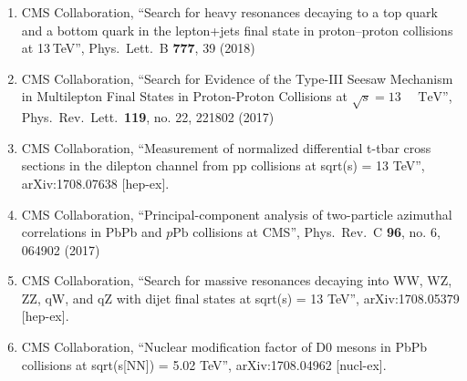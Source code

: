 \begin{enumerate}
\item CMS Collaboration, ``Search for heavy resonances decaying to a top quark and a bottom quark in the lepton+jets final state in proton–proton collisions at 13 TeV'', Phys.\ Lett.\ B {\bf 777}, 39 (2018)

\item CMS Collaboration, ``Search for Evidence of the Type-III Seesaw Mechanism in Multilepton Final States in Proton-Proton Collisions at $\sqrt{s}=13\text{ }\text{ }\mathrm{TeV}$'', Phys.\ Rev.\ Lett.\  {\bf 119}, no. 22, 221802 (2017)

\item CMS Collaboration, ``Measurement of normalized differential t-tbar cross sections in the dilepton channel from pp collisions at sqrt(s) = 13 TeV'', arXiv:1708.07638 [hep-ex].

\item CMS Collaboration, ``Principal-component analysis of two-particle azimuthal correlations in PbPb and $p\text{Pb}$ collisions at CMS'', Phys.\ Rev.\ C {\bf 96}, no. 6, 064902 (2017)

\item CMS Collaboration, ``Search for massive resonances decaying into WW, WZ, ZZ, qW, and qZ with dijet final states at sqrt(s) = 13 TeV'', arXiv:1708.05379 [hep-ex].

\item CMS Collaboration, ``Nuclear modification factor of D0 mesons in PbPb collisions at sqrt(s[NN]) = 5.02 TeV'', arXiv:1708.04962 [nucl-ex].


\end{enumerate}
